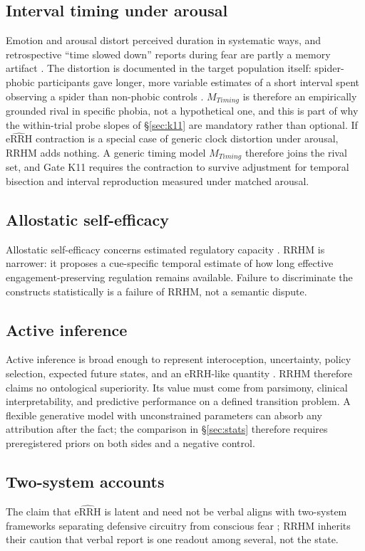 \documentclass[9pt,twocolumn]{article}
\newcommand{\eRRHhat}{\widehat{\mathrm{eRRH}}}
\begin{document}
\subsection{Interval timing under arousal}
Emotion and arousal distort perceived duration in systematic ways, and retrospective ``time slowed down'' reports during fear are partly a memory artifact \cite{droitvolet2007,stetson2007}. The distortion is documented in the target population itself: spider-phobic participants gave longer, more variable estimates of a short interval spent observing a spider than non-phobic controls \cite{watts1984}. $M_{Timing}$ is therefore an empirically grounded rival in specific phobia, not a hypothetical one, and this is part of why the within-trial probe slopes of \S\ref{sec:k11} are mandatory rather than optional. If $\eRRHhat$ contraction is a special case of generic clock distortion under arousal, RRHM adds nothing. A generic timing model $M_{Timing}$ therefore joins the rival set, and Gate K11 requires the contraction to survive adjustment for temporal bisection and interval reproduction measured under matched arousal.

\subsection{Allostatic self-efficacy}
Allostatic self-efficacy concerns estimated regulatory capacity \cite{stephan2016}. RRHM is narrower: it proposes a cue-specific temporal estimate of how long effective engagement-preserving regulation remains available. Failure to discriminate the constructs statistically is a failure of RRHM, not a semantic dispute.

\subsection{Active inference}
Active inference is broad enough to represent interoception, uncertainty, policy selection, expected future states, and an eRRH-like quantity \cite{paulus2019}. RRHM therefore claims no ontological superiority. Its value must come from parsimony, clinical interpretability, and predictive performance on a defined transition problem. A flexible generative model with unconstrained parameters can absorb any attribution after the fact; the comparison in \S\ref{sec:stats} therefore requires preregistered priors on both sides and a negative control.

\subsection{Two-system accounts}
The claim that $\eRRHhat$ is latent and need not be verbal aligns with two-system frameworks separating defensive circuitry from conscious fear \cite{ledoux2016}; RRHM inherits their caution that verbal report is one readout among several, not the state.
\end{document}
